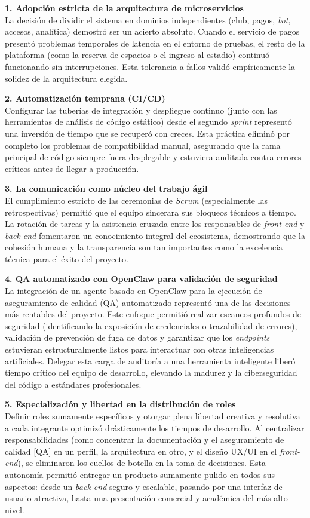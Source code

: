 \textbf{1. Adopción estricta de la arquitectura de microservicios}\\
La decisión de dividir el sistema en dominios independientes (club, pagos, \textit{bot}, accesos, analítica) demostró ser un acierto absoluto. Cuando el servicio de pagos presentó problemas temporales de latencia en el entorno de pruebas, el resto de la plataforma (como la reserva de espacios o el ingreso al estadio) continuó funcionando sin interrupciones. Esta tolerancia a fallos validó empíricamente la solidez de la arquitectura elegida.

\textbf{2. Automatización temprana (CI/CD)}\\
Configurar las tuberías de integración y despliegue continuo (junto con las herramientas de análisis de código estático) desde el segundo \textit{sprint} representó una inversión de tiempo que se recuperó con creces. Esta práctica eliminó por completo los problemas de compatibilidad manual, asegurando que la rama principal de código siempre fuera desplegable y estuviera auditada contra errores críticos antes de llegar a producción.

\textbf{3. La comunicación como núcleo del trabajo ágil}\\
El cumplimiento estricto de las ceremonias de \textit{Scrum} (especialmente las retrospectivas) permitió que el equipo sincerara sus bloqueos técnicos a tiempo. La rotación de tareas y la asistencia cruzada entre los responsables de \textit{front-end} y \textit{back-end} fomentaron un conocimiento integral del ecosistema, demostrando que la cohesión humana y la transparencia son tan importantes como la excelencia técnica para el éxito del proyecto.

\textbf{4. QA automatizado con OpenClaw para validación de seguridad}\\
La integración de un agente basado en OpenClaw para la ejecución de aseguramiento de calidad (QA) automatizado representó una de las decisiones más rentables del proyecto. Este enfoque permitió realizar escaneos profundos de seguridad (identificando la exposición de credenciales o trazabilidad de errores), validación de prevención de fuga de datos y garantizar que los \textit{endpoints} estuvieran estructuralmente listos para interactuar con otras inteligencias artificiales. Delegar esta carga de auditoría a una herramienta inteligente liberó tiempo crítico del equipo de desarrollo, elevando la madurez y la ciberseguridad del código a estándares profesionales.

\textbf{5. Especialización y libertad en la distribución de roles}\\
Definir roles sumamente específicos y otorgar plena libertad creativa y resolutiva a cada integrante optimizó drásticamente los tiempos de desarrollo. Al centralizar responsabilidades (como concentrar la documentación y el aseguramiento de calidad [QA] en un perfil, la arquitectura en otro, y el diseño UX/UI en el \textit{front-end}), se eliminaron los cuellos de botella en la toma de decisiones. Esta autonomía permitió entregar un producto sumamente pulido en todos sus aspectos: desde un \textit{back-end} seguro y escalable, pasando por una interfaz de usuario atractiva, hasta una presentación comercial y académica del más alto nivel.
